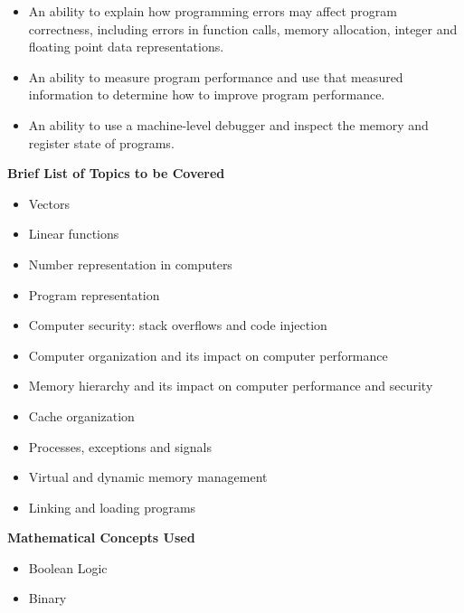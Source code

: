 {\begin{itemize}
        \item An ability to explain how programming errors may affect program correctness, including errors in function calls, memory allocation, integer and floating point data representations.
        \item An ability to measure program performance and use that measured information to determine how to improve program performance.
        \item An ability to use a machine-level debugger and inspect the memory and register state of programs.
    \end{itemize}
    
    \noindent \textbf{Brief List of Topics to be Covered}
    \begin{itemize}
        \item Vectors
        \item Linear functions
        \item Number representation in computers
        \item Program representation
        \item Computer security: stack overflows and code injection
        \item Computer organization and its impact on computer performance
        \item Memory hierarchy and its impact on computer performance and security
        \item Cache organization
        \item Processes, exceptions and signals
        \item Virtual and dynamic memory management
        \item Linking and loading programs
    \end{itemize}
    
    \noindent \textbf{Mathematical Concepts Used}
    \begin{itemize}
        \item Boolean Logic
        \item Binary
    \end{itemize}
}

